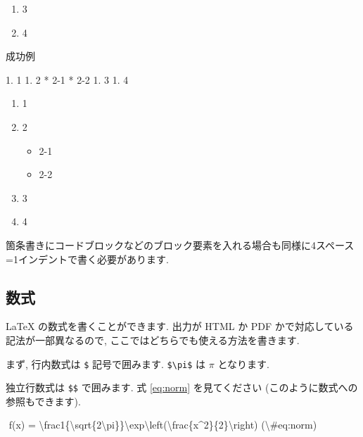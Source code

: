 \documentclass[
]{ltjsarticle}
\newenvironment{Shaded}{\begin{snugshade}}{\end{snugshade}}
\newcommand{\NormalTok}[1]{#1}
\newcommand{\SpecialCharTok}[1]{\textcolor[rgb]{0.00,0.00,0.00}{#1}}
\newcommand{\SpecialStringTok}[1]{\textcolor[rgb]{0.31,0.60,0.02}{#1}}
\providecommand{\tightlist}{%
  \setlength{\itemsep}{0pt}\setlength{\parskip}{0pt}}
\begin{document}
\begin{enumerate}
\def\labelenumi{\arabic{enumi}.}
\tightlist
\item
  3
\item
  4
\end{enumerate}

成功例

\begin{Shaded}
\begin{Highlighting}[]
\SpecialStringTok{1. }\NormalTok{1}
\SpecialStringTok{1. }\NormalTok{2}
\SpecialStringTok{    * }\NormalTok{2{-}1}
\SpecialStringTok{    * }\NormalTok{2{-}2}
\SpecialStringTok{1. }\NormalTok{3}
\SpecialStringTok{1. }\NormalTok{4}
\end{Highlighting}
\end{Shaded}

\begin{enumerate}
\def\labelenumi{\arabic{enumi}.}
\tightlist
\item
  1
\item
  2

  \begin{itemize}
  \tightlist
  \item
    2-1
  \item
    2-2
  \end{itemize}
\item
  3
\item
  4
\end{enumerate}

箇条書きにコードブロックなどのブロック要素を入れる場合も同様に4スペース=1インデントで書く必要があります.

\hypertarget{ux6570ux5f0f}{%
\subsection{数式}\label{ux6570ux5f0f}}

LaTeX の数式を書くことができます. 出力が HTML か PDF かで対応している記法が一部異なるので, ここではどちらでも使える方法を書きます.

まず, 行内数式は \texttt{\$} 記号で囲みます. \texttt{\$\textbackslash{}pi\$} は \(\pi\) となります.

独立行数式は \texttt{\$\$} で囲みます. 式 \eqref{eq:norm} を見てください (このように数式への参照もできます).

\begin{Shaded}
\begin{Highlighting}[]
\SpecialStringTok{$$}
\SpecialStringTok{f(x) = }\SpecialCharTok{\textbackslash{}frac}\SpecialStringTok{1\{}\SpecialCharTok{\textbackslash{}sqrt}\SpecialStringTok{\{2}\SpecialCharTok{\textbackslash{}pi}\SpecialStringTok{\}\}}\SpecialCharTok{\textbackslash{}exp\textbackslash{}left}\SpecialStringTok{(}\SpecialCharTok{\textbackslash{}frac}\SpecialStringTok{\{x\^{}2\}\{2\}}\SpecialCharTok{\textbackslash{}right}\SpecialStringTok{) (}\SpecialCharTok{\textbackslash{}\#}\SpecialStringTok{eq:norm)}
\SpecialStringTok{$$}
\end{Highlighting}
\end{Shaded}
\end{document}

